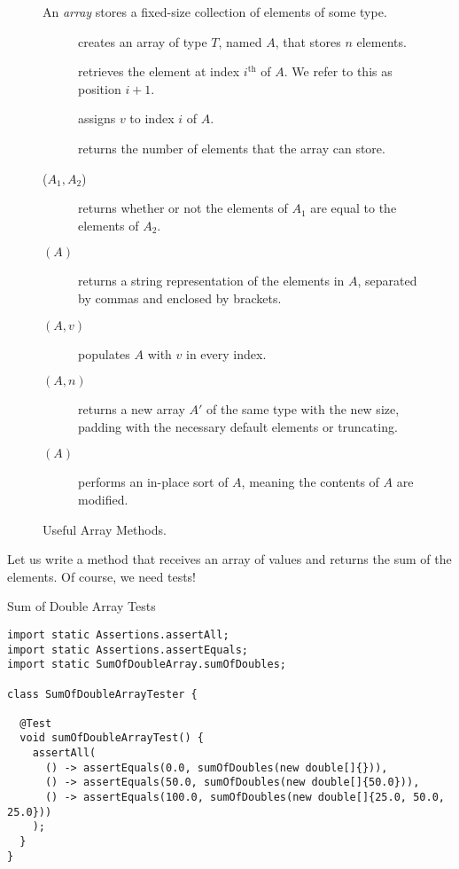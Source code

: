 \begin{figure}[tp]
  \small
  \begin{tcolorbox}[title=Java Arrays]
    An \textit{array} stores a fixed-size collection of elements of some type.
    \vspace{2ex}
  \begin{description}
    \item [] creates an array of type $T$, named $A$, that stores $n$ elements.
    \item [] retrieves the element at index $i^{\text{th}}$ of $A$. We refer to this as position $i + 1$.
    \item [] assigns $v$ to index $i$ of $A$.
    \item [] returns the number of elements that the array can store.
    \item [($A_1, A_2$)] returns whether or not the elements of $A_1$ are equal to the elements of $A_2$.
    \item [$(A)$] returns a string representation of the elements in $A$, separated by commas and enclosed by brackets.
    \item [$(A, v)$] populates $A$ with $v$ in every index.
    \item [$(A, n)$] returns a new array $A'$ of the same type with the new size, padding with the necessary default elements or truncating.
    \item [$(A)$] performs an in-place sort of $A$, meaning the contents of $A$ are modified.
  \end{description}
\end{tcolorbox}
  \caption{Useful Array Methods.}
  \label{fig:arrays}
\end{figure}

\example Let us write a method that receives an array of  values and returns the sum of the elements. Of course, we need tests!

\begin{cl}{Sum of Double Array Tests}
\begin{lstlisting}[language=MyJava]
import static Assertions.assertAll;
import static Assertions.assertEquals;
import static SumOfDoubleArray.sumOfDoubles;

class SumOfDoubleArrayTester {

  @Test
  void sumOfDoubleArrayTest() {
    assertAll(
      () -> assertEquals(0.0, sumOfDoubles(new double[]{})),
      () -> assertEquals(50.0, sumOfDoubles(new double[]{50.0})),
      () -> assertEquals(100.0, sumOfDoubles(new double[]{25.0, 50.0, 25.0}))
    );
  }
}
\end{lstlisting}
\end{cl}

